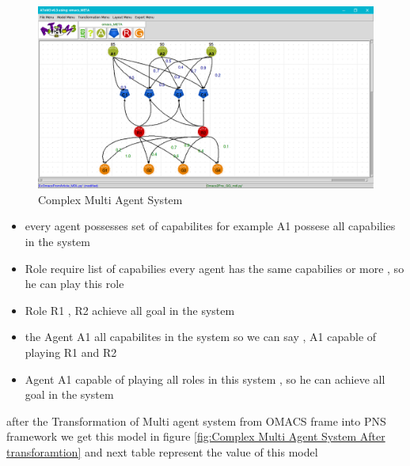 \begin{figure}[th]
	\centering
 	\includegraphics[scale=0.3]{Chapiter3/img/article}
	\caption{\label{fig:Complex Multi Agent System}Complex Multi Agent System}
\end{figure} 

\begin{itemize}
	\item every agent possesses set of capabilites for example A1 possese all capabilies in the system
	\item Role require list of capabilies every agent has the same capabilies or more , so he can play this role
	\item Role R1 , R2 achieve all goal in the system
	\item the Agent A1 all capabilites in the system so we can say , A1 capable of playing R1 and R2
	\item Agent A1 capable of playing all roles in this system , so he can achieve all goal in the system
\end{itemize}

after the Transformation of Multi agent system from OMACS frame into PNS framework we get this model in figure \ref{fig:Complex Multi Agent System After transforamtion} 
and next table represent the value of this model 

